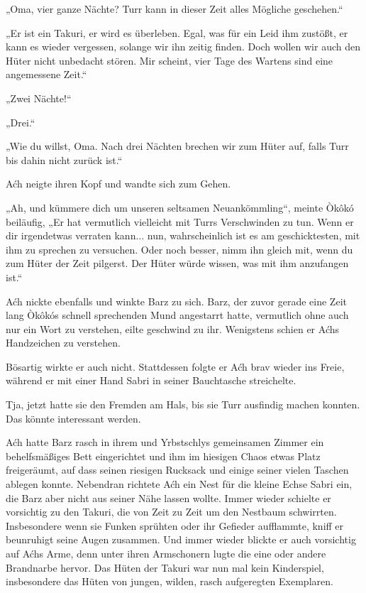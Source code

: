 „Oma, vier ganze Nächte? Turr kann in dieser Zeit alles Mögliche geschehen.“

„Er ist ein Takuri, er wird es überleben. Egal, was für ein Leid ihm zustößt, er kann es wieder vergessen, solange wir ihn zeitig finden. Doch wollen wir auch den Hüter nicht unbedacht stören. Mir scheint, vier Tage des Wartens sind eine angemessene Zeit.“

„Zwei Nächte!“

„Drei.“

„Wie du willst, Oma. Nach drei Nächten brechen wir zum Hüter auf, falls Turr bis dahin nicht zurück ist.“

Aćh neigte ihren Kopf und wandte sich zum Gehen.

„Ah, und kümmere dich um unseren seltsamen Neuankömmling“, meinte Òkôkó beiläufig, „Er hat vermutlich vielleicht mit Turrs Verschwinden zu tun. Wenn er dir irgendetwas verraten kann... nun, wahrscheinlich ist es am geschicktesten, mit ihm zu sprechen zu versuchen. Oder noch besser, nimm ihn gleich mit, wenn du zum Hüter der Zeit pilgerst. Der Hüter würde wissen, was mit ihm anzufangen ist.“

Aćh nickte ebenfalls und winkte Barz zu sich. Barz, der zuvor gerade eine Zeit lang Òkôkós schnell sprechenden Mund angestarrt hatte, vermutlich ohne auch nur ein Wort zu verstehen, eilte geschwind zu ihr. Wenigstens schien er Aćhs Handzeichen zu verstehen.

Bösartig wirkte er auch nicht. Stattdessen folgte er Aćh brav wieder ins Freie, während er mit einer Hand Sabri in seiner Bauchtasche streichelte.

Tja, jetzt hatte sie den Fremden am Hals, bis sie Turr ausfindig machen konnten. Das könnte interessant werden.



\trennzeichen



Aćh hatte Barz rasch in ihrem und Yrbstschlys gemeinsamen Zimmer ein behelfsmäßiges Bett eingerichtet und ihm im hiesigen Chaos etwas Platz freigeräumt, auf dass seinen riesigen Rucksack und einige seiner vielen Taschen ablegen konnte. Nebendran richtete Aćh ein Nest für die kleine Echse Sabri ein, die Barz aber nicht aus seiner Nähe lassen wollte. Immer wieder schielte er vorsichtig zu den Takuri, die von Zeit zu Zeit um den Nestbaum schwirrten. Insbesondere wenn sie Funken sprühten oder ihr Gefieder aufflammte, kniff er beunruhigt seine Augen zusammen. Und immer wieder blickte er auch vorsichtig auf Aćhs Arme, denn unter ihren Armschonern lugte die eine oder andere Brandnarbe hervor. Das Hüten der Takuri war nun mal kein Kinderspiel, insbesondere das Hüten von jungen, wilden, rasch aufgeregten Exemplaren.

